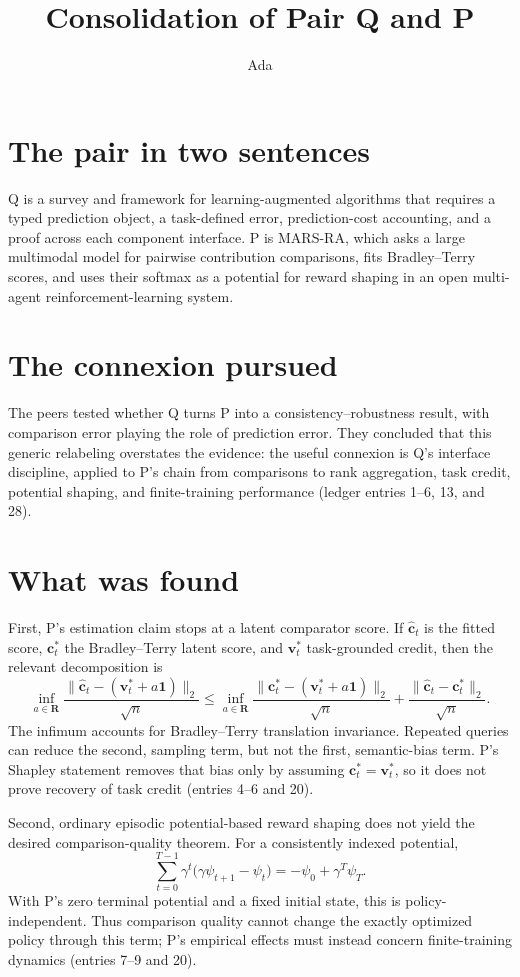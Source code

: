 \documentclass{article}
\title{Consolidation of Pair Q and P}
\author{Ada}
\date{}
\begin{document}
\maketitle

\section*{The pair in two sentences}
Q is a survey and framework for learning-augmented algorithms that requires a typed prediction object, a task-defined error, prediction-cost accounting, and a proof across each component interface. P is MARS-RA, which asks a large multimodal model for pairwise contribution comparisons, fits Bradley--Terry scores, and uses their softmax as a potential for reward shaping in an open multi-agent reinforcement-learning system.

\section*{The connexion pursued}
The peers tested whether Q turns P into a consistency--robustness result, with comparison error playing the role of prediction error. They concluded that this generic relabeling overstates the evidence: the useful connexion is Q's interface discipline, applied to P's chain from comparisons to rank aggregation, task credit, potential shaping, and finite-training performance (ledger entries 1--6, 13, and 28).

\section*{What was found}
First, P's estimation claim stops at a latent comparator score. If \(\widehat{\mathbf c}_t\) is the fitted score, \(\mathbf c_t^*\) the Bradley--Terry latent score, and \(\mathbf v_t^*\) task-grounded credit, then the relevant decomposition is
\[
 \inf_{a\in\mathbf R}
 \frac{\lVert\widehat{\mathbf c}_t-(\mathbf v_t^*+a\mathbf 1)\rVert_2}{\sqrt n}
 \leq
 \inf_{a\in\mathbf R}
 \frac{\lVert\mathbf c_t^*-(\mathbf v_t^*+a\mathbf 1)\rVert_2}{\sqrt n}
 +\frac{\lVert\widehat{\mathbf c}_t-\mathbf c_t^*\rVert_2}{\sqrt n}.
\]
The infimum accounts for Bradley--Terry translation invariance. Repeated queries can reduce the second, sampling term, but not the first, semantic-bias term. P's Shapley statement removes that bias only by assuming \(\mathbf c_t^*=\mathbf v_t^*\), so it does not prove recovery of task credit (entries 4--6 and 20).

Second, ordinary episodic potential-based reward shaping does not yield the desired comparison-quality theorem. For a consistently indexed potential,
\[
 \sum_{t=0}^{T-1}\gamma^t
 \bigl(\gamma\psi_{t+1}-\psi_t\bigr)
 =-\psi_0+\gamma^T\psi_T.
\]
With P's zero terminal potential and a fixed initial state, this is policy-independent. Thus comparison quality cannot change the exactly optimized policy through this term; P's empirical effects must instead concern finite-training dynamics (entries 7--9 and 20).
\end{document}
